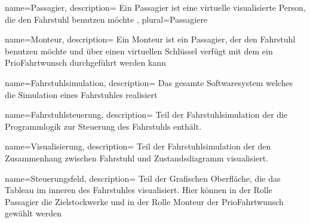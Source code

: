 {
	name=Passagier,
	description={
		Ein Passagier ist eine virtuelle visualisierte Person, die den Fahrstuhl benutzen möchte
	},
	plural=Passagiere
}

{
	name=Monteur,
	description={
		Ein Monteur ist ein \gls{Passagier}, der den Fahrstuhl benutzen möchte und über einen virtuellen Schlüssel verfügt mit dem ein \gls{PrioFahrtwunsch}
		durchgeführt werden kann
	}
}

{
	name=Fahrstuhlsimulation,
	description={
		Das gesamte Softwaresystem welches die Simulation eines Fahrstuhles realisiert
	}
}

{
	name=Fahrstuhlsteuerung,
	description={
		Teil der Fahrstuhlsimulation der die Programmlogik zur Steuerung des Fahrstuhls enthält.
	}
}

{
	name=Visualisierung,
	description={
		Teil der Fahrstuhlsimulation der den Zusammenhang zwischen Fahrstuhl und Zustandsdiagramm visualisiert.
	}
}

{
	name=Steuerungsfeld,
	description={
		Teil der Grafischen Oberfläche, die das Tableau im inneren des Fahrstuhles visualisiert. Hier können in der Rolle \gls{Passagier} die Zielstockwerke und in  der Rolle \gls{Monteur}  der \gls{PrioFahrtwunsch} gewählt werden
	}
}

